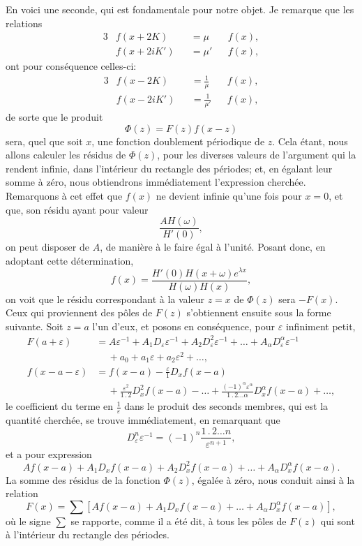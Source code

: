\documentclass[11pt,leqno,oneside,letterpaper]{book}[2005/09/16]
\newcommand{\cntrdot}{\mathbin{.}}
\begin{document}
En voici une seconde, qui est fondamentale pour notre objet. Je
remarque que les relations
\begin{alignat*}{3}
& f(x + 2K ) &&= \mu && f(x),\\
& f(x + 2iK') &&= \mu' && f(x),
\end{alignat*}
ont pour cons\'equence celles-ci:
\begin{alignat*}{3}
& f(x - 2K) &&= \tfrac{1}{\mu } && f(x),\\
& f(x - 2iK') &&= \tfrac{1}{\mu'} && f(x),
\end{alignat*}
de sorte que le produit
\[
\Phi(z) = F(z) f(x-z)
\]
sera, quel que soit $x$, une fonction doublement p\'eriodique de $z$. Cela \'etant,
nous allons calculer les r\'esidus de $\Phi(z)$, pour les diverses valeurs de l'argument
qui la rendent infinie, dans l'int\'erieur du rectangle des p\'eriodes; et,
en \'egalant leur somme \`a z\'ero, nous obtiendrons imm\'ediatement l'expression
cherch\'ee. Remarquons \`a cet effet que $f(x)$ ne devient infinie qu'une
fois pour $x = 0$, et que, son r\'esidu ayant pour valeur
\[
  \frac{AH(\omega)}{H'(0)},
\]
on peut disposer de $A$, de mani\`ere \`a le faire \'egal \`a l'unit\'e. Posant donc,
en adoptant cette d\'etermination,
\[
  f(x) = \frac{ H'(0) H(x+\omega)e^{\lambda x} }{ H(\omega) H(x) },
\]
on voit que le r\'esidu correspondant \`a la valeur $z = x$ de $\Phi(z)$ sera
$-F(x)$. Ceux qui proviennent des p\^oles de $F(z)$ s'obtiennent ensuite
sous la forme suivante. Soit $z = a$ l'un d'eux, et posons en cons\'equence,
pour $\varepsilon$ infiniment petit,
\begin{align*}
F(a+\varepsilon) &=
  A \varepsilon^{-1} +
  A_1 D_{\varepsilon} \varepsilon^{-1} +
  A_2 D_{\varepsilon}^2 \varepsilon^{-1} +
  \ldots +
  A_{\alpha} D_{\varepsilon}^{\alpha} \varepsilon^{-1} \\
  &\quad\ + a_0 + a_1 \varepsilon + a_2 \varepsilon^2 + \ldots, \\
f(x-a-\varepsilon) &=
  f(x-a) - \frac{\varepsilon}{1} D_x f(x-a) \\
&\quad\ +\frac{\varepsilon^2}{1 \cntrdot 2} D_x^2 f(x-a) -
  \ldots +
  \frac{(-1)^{\alpha} \varepsilon^{\alpha}}{1 \cntrdot 2 \ldots \alpha} D_x^{\alpha} f(x-a) + \ldots,
\end{align*}
le coefficient du terme en $\frac{1}{\varepsilon}$ dans le produit des seconds membres, qui est
la quantit\'e cherch\'ee, se trouve imm\'ediatement, en remarquant que
\[
D_{\varepsilon}^n \varepsilon^{-1} = (-1)^n \frac{1\cntrdot 2\ldots n}{\varepsilon^{n+1}},
\]
et a pour expression
\[
A f(x-a) + A_1 D_x f(x-a) +
A_2 D_x^2 f(x-a) + \ldots +
A_{\alpha} D_x^{\alpha} f(x-a) .
\]
La somme des r\'esidus de la fonction $\Phi(z)$, \'egal\'ee \`a z\'ero, nous conduit
ainsi \`a la relation\label{page5}
\[
F(x) = \sum \left[
A f(x-a) + A_1 D_x f(x-a) + \ldots +
A_{\alpha} D_x^{\alpha} f(x-a) \right] ,
\]
o\`u le signe $\sum$ se rapporte, comme il a \'et\'e dit, \`a tous les p\^oles de $F(z)$ qui
sont \`a l'int\'erieur du rectangle des p\'eriodes.
\end{document}
